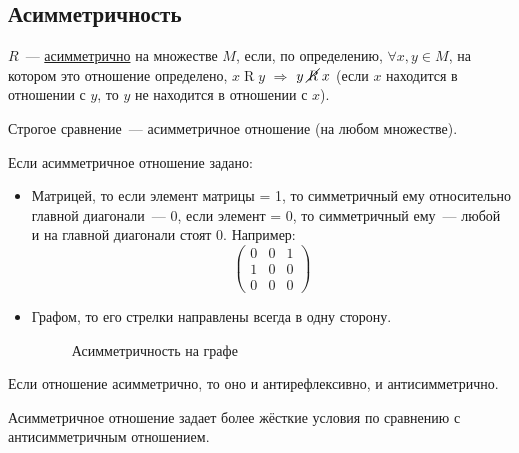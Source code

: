 \documentclass[russian]{lecture-notes}
\theoremstyle{definition}
\newcommand{\relation}[2]{$#1\mathrel{R}#2$}
\newcommand{\unrelation}[2]{$#1\mathrel{\cancel{R}}#2$}
\begin{document}
\subsection{Асимметричность \label{opr:asimmetr}}
\begin{definition}
	$R$~--- \underline{асимметрично} на множестве $M$, если, по определению, $\forall x, y \in M$, на котором это отношение определено, \relation{x}{y} $\Rightarrow$ \unrelation{y}{x} (если $x$ находится в отношении с $y$, то $y$ не находится в отношении с $x$).
\end{definition}

\begin{example}
	Строгое сравнение~--- асимметричное отношение (на любом множестве).
\end{example}

Если асимметричное отношение задано:
\begin{itemize}
	\item Матрицей, то если элемент матрицы = 1, то симметричный ему относительно главной диагонали~--- 0, если элемент = 0, то симметричный ему~--- любой и на главной диагонали стоят 0. Например:
	\begin{equation*}
	\left(
	\begin{array}{cccc}
	0 & 0 & 1\\
	1 & 0 & 0\\
	0 & 0 & 0
	\end{array}
	\right) 
	\end{equation*}
	
	\item Графом, то его стрелки направлены всегда в одну сторону.
	\begin{figure}[H]
		\centering
		\caption{\small Асимметричность на графе}
		\label{fig:asimmetr}
	\end{figure}
\end{itemize}

\begin{note*}
	Если отношение асимметрично, то оно и антирефлексивно, и антисимметрично.
\end{note*}

\begin{note*}
	Асимметричное отношение задает более жёсткие условия по сравнению с антисимметричным отношением.
\end{note*}
\end{document}
